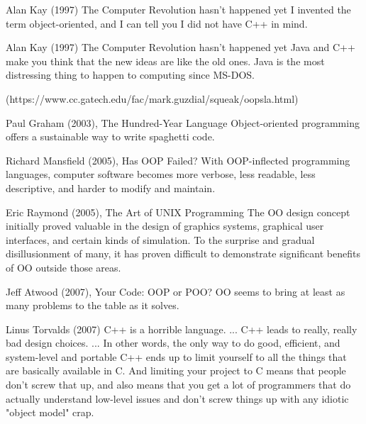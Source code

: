 \documentclass[12pt]{book}
\begin{document}
\begin{kodequote}{Alan Kay (1997) The Computer Revolution hasn't happened yet}
	I invented the term object-oriented, and I can tell you I did not have C++ in mind.
\end{kodequote}

\begin{kodequote}{Alan Kay (1997) The Computer Revolution hasn't happened yet}
	Java and C++ make you think that the new ideas are like the old ones. Java is the most distressing thing to happen to computing since MS-DOS.
\end{kodequote}

(https://www.cc.gatech.edu/fac/mark.guzdial/squeak/oopsla.html)

\begin{kodequote}{Paul Graham (2003), The Hundred-Year Language}
	Object-oriented programming offers a sustainable way to write spaghetti code.
\end{kodequote}

\begin{kodequote}{Richard Mansfield (2005), Has OOP Failed?}
	With OOP-inflected programming languages, computer software becomes more verbose, less readable, less descriptive, and harder to modify and maintain.
\end{kodequote}

\begin{kodequote}{Eric Raymond (2005), The Art of UNIX Programming}
	The OO design concept initially proved valuable in the design of graphics systems, graphical user interfaces, and certain kinds of simulation. To the surprise and gradual disillusionment of many, it has proven difficult to demonstrate significant benefits of OO outside those areas.
\end{kodequote}

\begin{kodequote}{Jeff Atwood (2007), Your Code: OOP or POO?}
	OO seems to bring at least as many problems to the table as it solves.
\end{kodequote}


\begin{kodequote}{Linus Torvalds (2007)}
	C++ is a horrible language. ... C++ leads to really, really bad design choices. ... In other words, the only way to do good, efficient, and system-level and portable C++ ends up to limit yourself to all the things that are basically available in C. And limiting your project to C means that people don't screw that up, and also means that you get a lot of programmers that do actually understand low-level issues and don't screw things up with any idiotic "object model" crap.
\end{kodequote}
\end{document}

